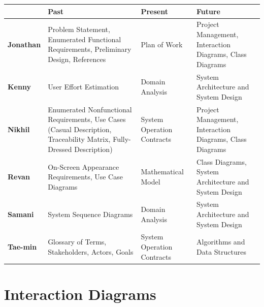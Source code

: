 \documentclass[letterpaper,english, 12pt]{scrreprt}
\begin{document}
\begin{center}
        \begin{tabular}{|C{2cm}|C{6cm}|C{3cm}|C{3cm}|}
                \hline
                         & \textbf{Past} & \textbf{Present} & \textbf{Future}  \\
                \hline
                        \textbf{Jonathan} & Problem Statement, Enumerated Functional Requirements, Preliminary Design, References & Plan of Work & Project Management, Interaction Diagrams, Class Diagrams \\
                \hline
                        \textbf{Kenny} & User Effort Estimation & Domain Analysis & System Architecture and System Design \\
                \hline
                        \textbf{Nikhil} & Enumerated Nonfunctional Requirements, Use Cases (Casual Description, Traceability Matrix, Fully-Dressed Description) & System Operation Contracts & Project Management, Interaction Diagrams, Class Diagrams  \\
                \hline
                        \textbf{Revan} & On-Screen Appearance Requirements, Use Case Diagrams & Mathematical Model & Class Diagrams, System Architecture and System Design \\
                \hline
                        \textbf{Samani} & System Sequence Diagrams & Domain Analysis & System Architecture and System Design \\
                \hline
                        \textbf{Tae-min} & Glossary of Terms, Stakeholders, Actors, Goals & System Operation Contracts & Algorithms and Data Structures \\
                \hline   
                       
        \end{tabular}
\end{center}

\chapter{Interaction Diagrams}
	
\end{document}

